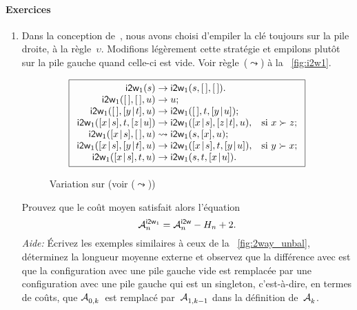 \paragraph{Exercices}
\begin{enumerate}

  \item Dans la conception de~, nous
    avons choisi d'empiler la clé toujours sur la pile droite, à la
    règle~\(\upsilon\). Modifions légèrement cette stratégie et
    empilons plutôt sur la pile gauche quand celle-ci est vide. Voir
    règle~(\(\leadsto\)) à la \fig~\vref{fig:i2w1}.
    \begin{figure}[b]
    \begin{equation*}
      \boxed{%
      \begin{array}{r@{\;}l@{\;}ll}
        \fun{i2w}_1(s) & \rightarrow
                      & \fun{i2w}_1(s,\el,\el).\\
        \fun{i2w}_1(\el,\el,u) & \rightarrow & u;\\
        \fun{i2w}_1(\el,\cons{y}{t},u)
                     & \rightarrow
                     & \fun{i2w}_1(\el,t,\cons{y}{u});\\
        \fun{i2w}_1(\cons{x}{s},t,\cons{z}{u})
                     & \rightarrow
                     & \fun{i2w}_1(\cons{x}{s},\cons{z}{t},u),
                     & \text{si \(x \succ z\)};\\
        \fun{i2w}_1(\cons{x}{s},\el,u)
                     & \leadsto
                     & \fun{i2w}_1(s,[x],u);\\
        \fun{i2w}_1(\cons{x}{s},\cons{y}{t},u)
                     & \rightarrow
                     & \fun{i2w}_1(\cons{x}{s},t,\cons{y}{u}),
                     & \text{si \(y \succ x\)};\\
        \fun{i2w}_1(\cons{x}{s},t,u)
                     & \rightarrow
                     & \fun{i2w}_1(s,t,\cons{x}{u}).
      \end{array}}
    \end{equation*}
    \caption{Variation  sur  (voir (\(\leadsto\)))}
    \label{fig:i2w1}
    \end{figure}
    Prouvez que le coût moyen satisfait alors l'équation
     
    \begin{equation*}
      \M{\fun{i2w}_1}{n} = \M{\fun{i2w}}{n} - H_n + 2.
    \end{equation*}
    \emph{Aide:} Écrivez les exemples similaires à ceux de la
    \fig~\vref{fig:2way_unbal}, déterminez la longueur moyenne externe
    et observez que la différence avec
     est que la configuration avec
    une pile gauche vide est remplacée par une configuration avec une
    pile gauche qui est un singleton, c'est-à-dire, en termes de
    coûts, que \(\M{}{0,k}\)~est remplacé par~\(\M{}{1,k-1}\) dans la
    définition de~\(\M{}{k}\).


\end{enumerate}
